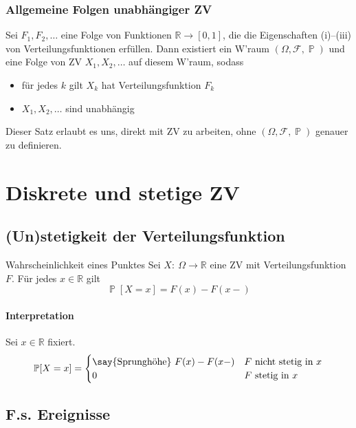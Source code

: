 \documentclass[a4paper,10pt]{article}
\def\R{\mathbb{R}}
\def\F{\mathcal{F}}
\renewcommand{\P}{\operatorname{\mathbb{P}}}
\numberwithin{equation}{section}
\begin{document}
\subsubsection{Allgemeine Folgen unabhängiger ZV}

\begin{mainbox}{}
    Sei \( F_1, F_2, \dots \) eine Folge von Funktionen \( \R \to [0, 1] \), die die Eigenschaften (i)–(iii) von Verteilungsfunktionen erfüllen. Dann existiert ein W'raum \( (\Omega, \F, \P) \) und eine Folge von ZV \( X_1, X_2, \dots \) auf diesem W'raum, sodass
    \begin{itemize}
        \item für jedes \( k \) gilt \( X_k \) hat Verteilungsfunktion \( F_k \)
        \item \( X_1, X_2, \dots \) sind unabhängig
    \end{itemize}
    \label{satz:slides_2_35}
\end{mainbox}

Dieser Satz erlaubt es uns, direkt mit ZV zu arbeiten, ohne \( (\Omega, \F, \P) \) genauer zu definieren.

\section{Diskrete und stetige ZV}

\subsection{(Un)stetigkeit der Verteilungsfunktion}

\begin{mainbox}{Wahrscheinlichkeit eines Punktes}
    Sei \( X: \: \Omega \to \R \) eine ZV mit Verteilungsfunktion \( F \). Für jedes \( x \in \R \) gilt
    \[
        \P[X = x] = F(x) - F(x-)
    \]
\end{mainbox}

\paragraph{Interpretation} Sei \( x \in \R \) fixiert.
\[
    \P[X = x] = \begin{cases}
        \text{\say{Sprunghöhe}} \ F(x) - F(x-) & F \ \text{nicht stetig in} \ x \\
        0 & F \ \text{stetig in} \ x
    \end{cases}
\]

\subsection{F.s. Ereignisse}
\end{document}
